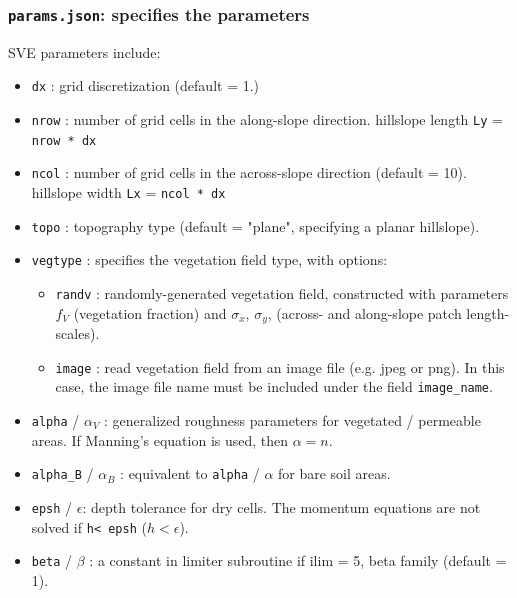 \documentclass{article}
\newcommand{\code}[1]{\texttt{#1}}
\begin{document}
\subsubsection{\code{params.json}: specifies the parameters}
SVE parameters include:
\begin{itemize}
	\item \code{dx} : grid discretization (default = 1.)  
	\item \code{nrow} :  number of grid cells in the along-slope direction.
		\subitem hillslope length \code{Ly} = \code{nrow * dx} 
	\item \code{ncol} :  number of grid cells in the across-slope direction (default = 10).
	 	\subitem hillslope width \code{Lx} = \code{ncol * dx} 
	\item \code{topo} : topography type (default = "plane", specifying a planar hillslope). 

	\item \code{vegtype} : specifies the vegetation field type, with options:
		\begin{itemize}
		\item \code{randv} : randomly-generated vegetation field, constructed with parameters $f_V$ (vegetation fraction) and $\sigma_x$, $\sigma_y$, (across- and along-slope patch length-scales).
	    \item \code{image} : read vegetation field from an image file (e.g. jpeg or png). In this case, the image file name must be included under the field \code{image\_name}.
		\end{itemize}
	\item \code{alpha} / $\alpha_V$ : generalized roughness parameters for vegetated / permeable areas. If Manning's equation is used, then  $\alpha = n$.
	\item \code{alpha\_B} / $\alpha_B$ : equivalent to \code{alpha} / $\alpha$   for bare soil areas.
	\item \code{epsh} / $\epsilon$: depth tolerance for dry cells.  The momentum equations are not solved if \code{h< epsh} ($h<\epsilon$).
	\item \code{beta} / $\beta$ : a constant in limiter subroutine if ilim = 5, beta family (default = 1).   
\end{itemize}
\end{document}
